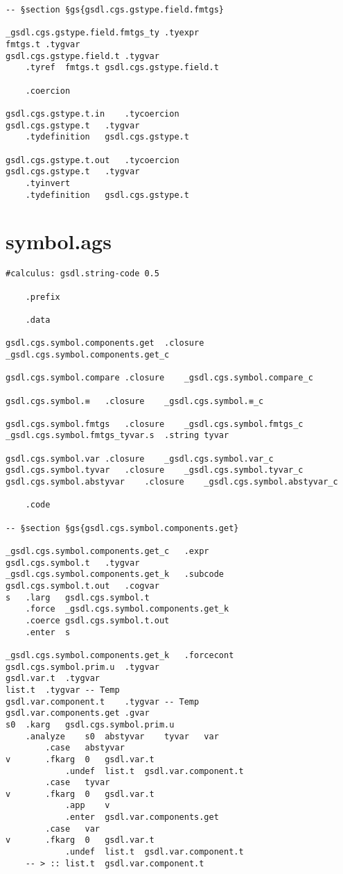 \documentclass{report}
\begin{document}
\begin{verbatim}
-- §section §gs{gsdl.cgs.gstype.field.fmtgs}

_gsdl.cgs.gstype.field.fmtgs_ty	.tyexpr
fmtgs.t	.tygvar
gsdl.cgs.gstype.field.t	.tygvar
	.tyref	fmtgs.t	gsdl.cgs.gstype.field.t

	.coercion

gsdl.cgs.gstype.t.in	.tycoercion
gsdl.cgs.gstype.t	.tygvar
	.tydefinition	gsdl.cgs.gstype.t

gsdl.cgs.gstype.t.out	.tycoercion
gsdl.cgs.gstype.t	.tygvar
	.tyinvert
	.tydefinition	gsdl.cgs.gstype.t
\end{verbatim}

\section{symbol.ags}

\begin{verbatim}
#calculus: gsdl.string-code 0.5

	.prefix

	.data

gsdl.cgs.symbol.components.get	.closure	_gsdl.cgs.symbol.components.get_c

gsdl.cgs.symbol.compare	.closure	_gsdl.cgs.symbol.compare_c

gsdl.cgs.symbol.≡	.closure	_gsdl.cgs.symbol.≡_c

gsdl.cgs.symbol.fmtgs	.closure	_gsdl.cgs.symbol.fmtgs_c
_gsdl.cgs.symbol.fmtgs_tyvar.s	.string	tyvar

gsdl.cgs.symbol.var	.closure	_gsdl.cgs.symbol.var_c
gsdl.cgs.symbol.tyvar	.closure	_gsdl.cgs.symbol.tyvar_c
gsdl.cgs.symbol.abstyvar	.closure	_gsdl.cgs.symbol.abstyvar_c

	.code

-- §section §gs{gsdl.cgs.symbol.components.get}

_gsdl.cgs.symbol.components.get_c	.expr
gsdl.cgs.symbol.t	.tygvar
_gsdl.cgs.symbol.components.get_k	.subcode
gsdl.cgs.symbol.t.out	.cogvar
s	.larg	gsdl.cgs.symbol.t
	.force	_gsdl.cgs.symbol.components.get_k
	.coerce	gsdl.cgs.symbol.t.out
	.enter	s

_gsdl.cgs.symbol.components.get_k	.forcecont
gsdl.cgs.symbol.prim.u	.tygvar
gsdl.var.t	.tygvar
list.t	.tygvar	-- Temp
gsdl.var.component.t	.tygvar	-- Temp
gsdl.var.components.get	.gvar
s0	.karg	gsdl.cgs.symbol.prim.u
	.analyze	s0	abstyvar	tyvar	var
		.case	abstyvar
v		.fkarg	0	gsdl.var.t
			.undef	list.t	gsdl.var.component.t
		.case	tyvar
v		.fkarg	0	gsdl.var.t
			.app	v
			.enter	gsdl.var.components.get
		.case	var
v		.fkarg	0	gsdl.var.t
			.undef	list.t	gsdl.var.component.t
	-- > :: list.t	gsdl.var.component.t


\end{verbatim}
\end{document}
